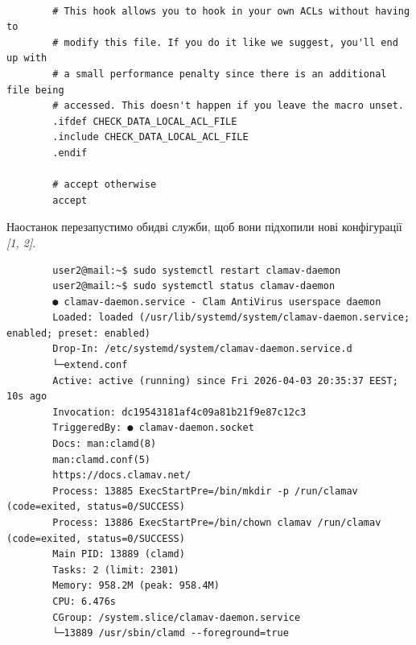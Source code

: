 \documentclass[14pt, a4paper]{extreport}
\begin{document}
\begin{verbatim}
		
		# This hook allows you to hook in your own ACLs without having to
		# modify this file. If you do it like we suggest, you'll end up with
		# a small performance penalty since there is an additional file being
		# accessed. This doesn't happen if you leave the macro unset.
		.ifdef CHECK_DATA_LOCAL_ACL_FILE
		.include CHECK_DATA_LOCAL_ACL_FILE
		.endif
		
		# accept otherwise
		accept
	\end{verbatim}
	
	Наостанок перезапустимо обидві служби, щоб вони підхопили нові конфігурації \textit{[1, 2]}.
	
	\begin{verbatim}
		user2@mail:~$ sudo systemctl restart clamav-daemon
		user2@mail:~$ sudo systemctl status clamav-daemon
		● clamav-daemon.service - Clam AntiVirus userspace daemon
		Loaded: loaded (/usr/lib/systemd/system/clamav-daemon.service; enabled; preset: enabled)
		Drop-In: /etc/systemd/system/clamav-daemon.service.d
		└─extend.conf
		Active: active (running) since Fri 2026-04-03 20:35:37 EEST; 10s ago
		Invocation: dc19543181af4c09a81b21f9e87c12c3
		TriggeredBy: ● clamav-daemon.socket
		Docs: man:clamd(8)
		man:clamd.conf(5)
		https://docs.clamav.net/
		Process: 13885 ExecStartPre=/bin/mkdir -p /run/clamav (code=exited, status=0/SUCCESS)
		Process: 13886 ExecStartPre=/bin/chown clamav /run/clamav (code=exited, status=0/SUCCESS)
		Main PID: 13889 (clamd)
		Tasks: 2 (limit: 2301)
		Memory: 958.2M (peak: 958.4M)
		CPU: 6.476s
		CGroup: /system.slice/clamav-daemon.service
		└─13889 /usr/sbin/clamd --foreground=true
		

\end{verbatim}
\end{document}
